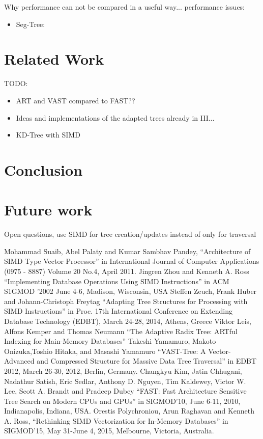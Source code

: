\documentclass[conference]{IEEEtran}
\begin{document}
Why performance can not be compared in a useful way...
performance issues:
\begin{itemize}
	\item Seg-Tree: 
\end{itemize}
\section{Related Work}
TODO:
\begin{itemize}
	\item ART and VAST compared to FAST??
	\item Ideas and implementations of the adapted trees already in III...
	\item KD-Tree with SIMD
\end{itemize}

\section{Conclusion}

\section{Future work}
Open questions, use SIMD for tree creation/updates instead of only for traversal
\begin{thebibliography}{00}
Mohammad Suaib, Abel Palaty and Kumar Sambhav Pandey, ``Architecture of SIMD Type Vector Processor'' in International Journal of Computer Applications (0975 - 8887) Volume 20 No.4, April 2011.
 Jingren Zhou and Kenneth A. Ross  ``Implementing Database Operations Using SIMD Instructions'' in ACM S1GMOD '2002 June 4-6, Madison, Wisconsin, USA
 Steffen Zeuch, Frank Huber and Johann-Christoph Freytag  ``Adapting Tree Structures for Processing with SIMD Instructions'' in Proc. 17th International Conference on Extending Database Technology (EDBT), March 24-28, 2014, Athens, Greece
 Viktor Leis, Alfons Kemper and Thomas Neumann ``The Adaptive Radix Tree: ARTful Indexing for Main-Memory Databases''
 Takeshi Yamamuro, Makoto Onizuka,Toshio Hitaka, and Masashi Yamamuro ``VAST-Tree: A Vector-Advanced and Compressed Structure for Massive Data Tree Traversal'' in EDBT 2012, March 26-30, 2012, Berlin, Germany.
 Changkyu Kim, Jatin Chhugani, Nadathur Satish, Eric Sedlar, Anthony D. Nguyen,
Tim Kaldewey, Victor W. Lee, Scott A. Brandt and Pradeep Dubey ``FAST: Fast Architecture Sensitive Tree Search
on Modern CPUs and GPUs'' in SIGMOD’10, June 6-11, 2010, Indianapolis, Indiana, USA.
Orestis Polychroniou, Arun Raghavan and Kenneth A. Ross, ``Rethinking SIMD Vectorization for In-Memory Databases'' in SIGMOD’15, May 31-June 4, 2015, Melbourne, Victoria, Australia.
\end{thebibliography}
\end{document}
